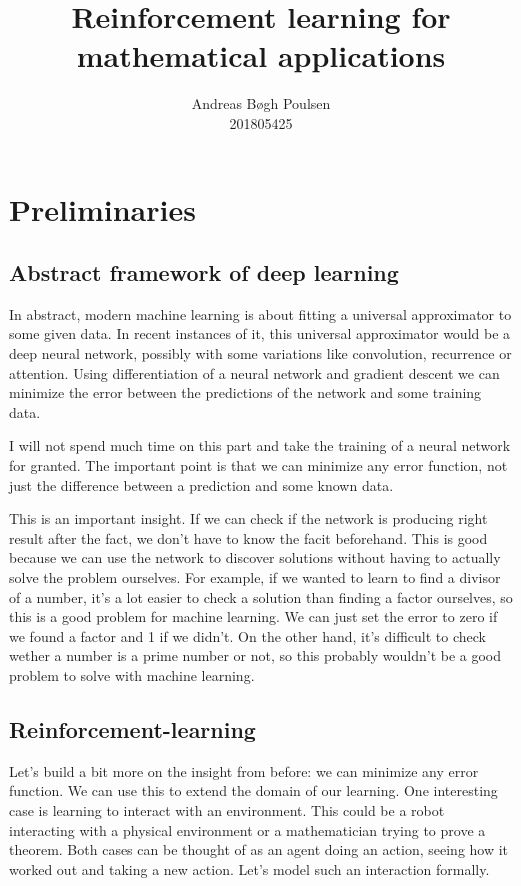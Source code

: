 \documentclass{article}
\title{Reinforcement learning for mathematical applications}
\author{
    Andreas Bøgh Poulsen\\
    201805425
}
\theoremstyle{changedot}
\theoremstyle{changedotbreak}
\theoremstyle{nonumberplain}
\begin{document}
\maketitle

\section{Preliminaries}

\subsection{Abstract framework of deep learning}
In abstract, modern machine learning is about fitting a universal approximator
to some given data. In recent instances of it, this universal approximator would
be a deep neural network, possibly with some variations like convolution,
recurrence or attention. Using differentiation of a neural network and gradient
descent we can minimize the error between the predictions of the network and
some training data.

I will not spend much time on this part and take the training of a neural
network for granted. The important point is that we can minimize any error
function, not just the difference between a prediction and some known data.

This is an important insight. If we can check if the network is producing right
result after the fact, we don't have to know the facit beforehand. This is good
because we can use the network to discover solutions without having to actually
solve the problem ourselves. For example, if we wanted to learn to find a
divisor of a number, it's a lot easier to check a solution than finding a factor
ourselves, so this is a good problem for machine learning. We can just set the
error to zero if we found a factor and 1 if we didn't. On the other hand, it's
difficult to check wether a number is a prime number or not, so this probably
wouldn't be a good problem to solve with machine learning.

\subsection{Reinforcement-learning}
Let's build a bit more on the insight from before: we can minimize any error
function. We can use this to extend the domain of our learning. One interesting
case is learning to interact with an environment. This could be a robot
interacting with a physical environment or a mathematician trying to prove a
theorem. Both cases can be thought of as an agent doing an action, seeing how it
worked out and taking a new action. Let's model such an interaction formally.
\end{document}
